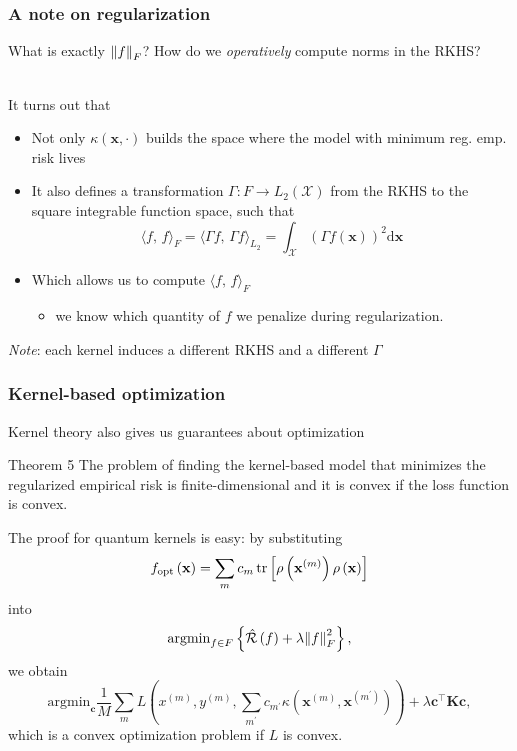 \documentclass[aspectratio=43]{beamer}
\newcommand{\inner}[2]{\langle #1,\, #2\rangle}
\newcommand{\kernel}[2]{\kappa\left( #1, #2 \right)}
\begin{document}
\begin{frame}
  \frametitle{A note on regularization}

  What is exactly $\norm{f}_F$? How do we \emph{operatively} compute norms in the RKHS?

  \ \\
  It turns out that
  \begin{itemize}
    \item Not only $\kernel{\mathbf{x}}{\cdot}$ builds the space where the model with minimum reg. emp. risk lives
    \item It also defines a transformation $\Gamma:F\rightarrow L_2(\mathcal{X})$ from the RKHS to the square integrable function space, such that
    \[\inner{f}{f}_F=\inner{\Gamma f}{\Gamma f}_{L_2} = \int_\mathcal{X} \left( \Gamma f(\mathbf{x})  \right)^2 \mathrm{d}\mathbf{x}\]
    \item Which allows us to compute $\inner{f}{f}_F$
    \begin{itemize}
      \item we know which quantity of $f$ we penalize during regularization.
    \end{itemize} 
  \end{itemize}

  \emph{Note}: each kernel induces a different RKHS and a different $\Gamma$

\end{frame}


\begin{frame}
  \frametitle{Kernel-based optimization}

  Kernel theory also gives us guarantees about optimization

  \begin{block}{Theorem 5}
    The problem of finding the kernel-based model that minimizes the regularized empirical risk is finite-dimensional and it is convex if the loss function is convex.
  \end{block}

  \footnotesize
  The proof for quantum kernels is easy: by substituting 
  \[f_{\mathrm{opt}}\left( \mathbf{x} \right) = \sum_m c_m \tr\left[ \rho\left( \mathbf{x}^{(m)} \right) \rho\left( \mathbf{x} \right)\right]\]
  into
  \[\mathrm{argmin}_{f\in F}\left\{ \hat{\mathcal{R}}\left( f \right) + \lambda \norm{f}^2_F \right\},\]
  we obtain
  \[\mathrm{argmin}_\mathbf{c} \frac{1}{M}\sum_m L\left( x^{(m)}, y^{(m)}, \sum_{m^\prime} c_{m^\prime} \kernel{\mathbf{x}^{(m)}}{\mathbf{x}^{(m^\prime)}} \right) + \lambda \mathbf{c}^\top \mathbf{K} \mathbf{c},\]
  which is a convex optimization problem if $L$ is convex.

\end{frame}
\end{document}
